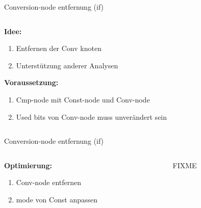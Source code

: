 \begin{frame}{Conversion-node entfernung (if)}

\begin{columns}
	\begin{column}{0.5\textwidth}
		\textbf{Idee:}
		\begin{enumerate}
			\item Entfernen der Conv knoten
			\item Unterstützung anderer Analysen
		\end{enumerate}
		\textbf{Voraussetzung:}
		\begin{enumerate}
			\item Cmp-node mit Const-node und Conv-node
			\item Used bits von Conv-node muss unverändert sein
		\end{enumerate}
	\end{column}
	\begin{column}{0.5\textwidth}  %
		\begin{center}
		   
		\end{center}
	\end{column}
\end{columns}
\end{frame}

\begin{frame}{Conversion-node entfernung (if)}

\begin{columns}
	\begin{column}{0.5\textwidth}
		\textbf{Optimierung:}
		\begin{enumerate}
			\item Conv-node entfernen
			\item mode von Const anpassen
		\end{enumerate}
	\end{column}
	\begin{column}{0.5\textwidth}  %
		\begin{center}
			FIXME
		\end{center}
	\end{column}
\end{columns}
\end{frame}